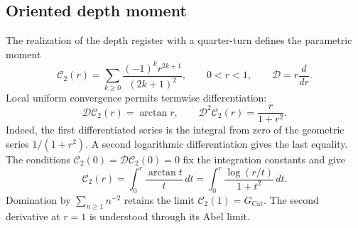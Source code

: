 \subsection{Oriented depth moment}
\label{corpus9:iv:pell-momento}

The realization of the depth register with a quarter-turn
defines the parametric moment
\[
 \mathcal C_2(r)=
   \sum_{k\geq0}\frac{(-1)^kr^{2k+1}}{(2k+1)^2},
 \qquad 0<r<1,\qquad
 \mathcal D=r\frac{d}{dr}.
\]
Local uniform convergence permits termwise differentiation:
\[
 \mathcal D\mathcal C_2(r)=\arctan r,\qquad
 \mathcal D^2\mathcal C_2(r)=\frac{r}{1+r^2}.
\]
Indeed, the first differentiated series is the integral from zero
of the geometric series \(1/(1+r^2)\). A second logarithmic
differentiation gives the last equality. The conditions
\(\mathcal C_2(0)=\mathcal D\mathcal C_2(0)=0\) fix the
integration constants and give
\[
 \mathcal C_2(r)=\int_0^r\frac{\arctan t}{t}\,dt
   =\int_0^r\frac{\log(r/t)}{1+t^2}\,dt.
\]
Domination by \(\sum_{n\geq1}n^{-2}\) retains the limit
\(\mathcal C_2(1)=G_{\mathrm{Cat}}\). The second derivative
at \(r=1\) is understood through its Abel limit.
